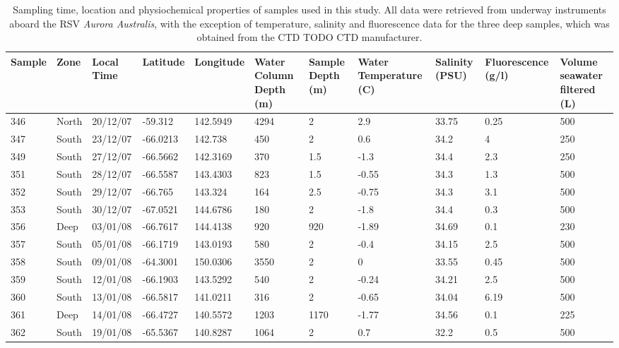 \begin{sidewaystable}
\caption[Details of samples used in Polar Front study]{Sampling time, location and physiochemical properties of samples used in this study. All data were retrieved from underway instruments aboard the RSV \emph{Aurora Australis}, with the exception of temperature, salinity and fluorescence data for the three deep samples, which was obtained from the \ac{CTD} TODO CTD manufacturer.}
\label{tab:samplelist}
\smallskip
\begin{tabularx}{\textheight}{lllllXXXllX}
\toprule
Sample & Zone & Local Time & Latitude & Longitude & Water Column Depth (m) & Sample Depth (m) & Water \linebreak Temperature (\textdegree{}C) & Salinity (PSU) & Fluorescence (\textmu{}g/l) & Volume \linebreak seawater \linebreak filtered (L) \\
\midrule
346 & North & 20/12/07 & -59.312 & 142.5949 & 4294 & 2 & 2.9 & 33.75 & 0.25 & 500\\
347 & South & 23/12/07 & -66.0213 & 142.738 & 450 & 2 & 0.6 & 34.2 & 4 & 250\\
349 & South & 27/12/07 & -66.5662 & 142.3169 & 370 & 1.5 & -1.3 & 34.4 & 2.3 & 250\\
351 & South & 28/12/07 & -66.5587 & 143.4303 & 823 & 1.5 & -0.55 & 34.3 & 1.3 & 500\\
352 & South & 29/12/07 & -66.765 & 143.324 & 164 & 2.5 & -0.75 & 34.3 & 3.1 & 500\\
353 & South & 30/12/07 & -67.0521 & 144.6786 & 180 & 2 & -1.8 & 34.4 & 0.3 & 500\\
356 & Deep & 03/01/08 & -66.7617 & 144.4138 & 920 & 920 & -1.89 & 34.69 & 0.1 & 230\\
357 & South & 05/01/08 & -66.1719 & 143.0193 & 580 & 2 & -0.4 & 34.15 & 2.5 & 500\\
358 & South & 09/01/08 & -64.3001 & 150.0306 & 3550 & 2 & 0 & 33.55 & 0.45 & 500\\
359 & South & 12/01/08 & -66.1903 & 143.5292 & 540 & 2 & -0.24 & 34.21 & 2.5 & 500\\
360 & South & 13/01/08 & -66.5817 & 141.0211 & 316 & 2 & -0.65 & 34.04 & 6.19 & 500\\
361 & Deep & 14/01/08 & -66.4727 & 140.5572 & 1203 & 1170 & -1.77 & 34.56 & 0.1 & 225\\
362 & South & 19/01/08 & -65.5367 & 140.8287 & 1064 & 2 & 0.7 & 32.2 & 0.5 & 500\\

\end{tabularx}
\end{sidewaystable}
